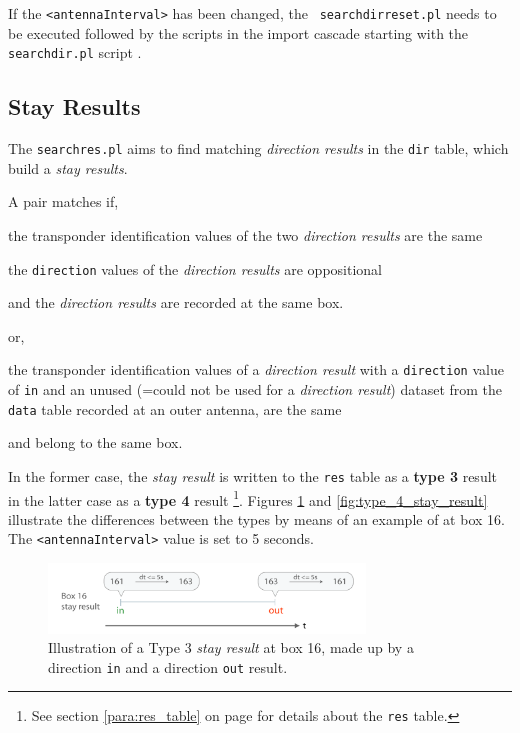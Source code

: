 If the \lstinline|<antennaInterval>| has been changed, the \lstinline| searchdirreset.pl| needs to be executed followed by the scripts in the import cascade starting with the \lstinline|searchdir.pl| script \footnotemark[14]. 

\subsection{Stay Results}
\label{subsec:stayres}

The \lstinline|searchres.pl| aims to find matching \textit{direction results} in the \lstinline|dir| table, which build a \textit{stay results}.

A pair matches if,

\begin{mylist}
\item the transponder identification values of the two \textit{direction results} are the same
\item the \lstinline|direction| values of the \textit{direction results} are oppositional
\item and the \textit{direction results} are recorded at the same box.
\end{mylist}

or,

\begin{mylist}
\item the transponder identification values of a \textit{direction result} with a \lstinline|direction| value of \lstinline|in| and an unused (=could not be used for a \textit{direction result}) dataset from the \lstinline|data| table recorded at an outer antenna, are the same
\item and belong to the same box.
\end{mylist}

In the former case, the \textit{stay result} is written to the \lstinline|res| table as a \textbf{type 3} result in the latter case as a \textbf{type 4} result \footnote{See section \ref{para:res_table} on page \pageref{para:res_table} for details about the \lstinline|res| table.}. Figures \ref{fig:type_3_stay_result} and \ref{fig:type_4_stay_result} illustrate the differences between the types by means of an example of at box 16. The \lstinline|<antennaInterval>| value is set to 5 seconds.

\begin{figure}[htpb]
\begin{center}
  \includegraphics[width=0.75\textwidth]{assets/pdf/stay_result_type_3_schema.pdf}
  \caption[Illustration of a Type 3 \textit{stay result}]{Illustration of a Type 3 \textit{stay result} at box 16,  made up by a direction \lstinline|in| and a direction \lstinline|out| result.}
  \label{fig:type_3_stay_result}
\end{center}
\end{figure}

